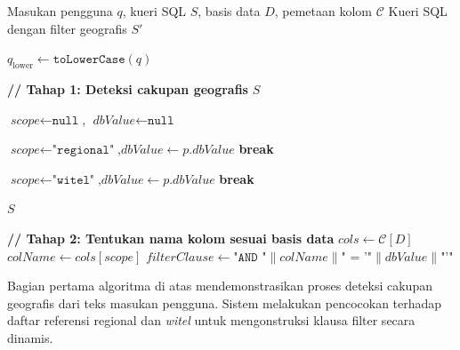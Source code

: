 \begin{algorithm}[htbp]
\caption{Injeksi Filter Geografis ke dalam Kueri SQL (Bagian 1)}
\label{alg:geo-filter-1}
\begin{algorithmic}[1]
\Require Masukan pengguna $q$, kueri SQL $S$, basis data $D$, pemetaan kolom $\mathcal{C}$
\Ensure Kueri SQL dengan filter geografis $S'$

\State $q_{\text{lower}} \gets \texttt{toLowerCase}(q)$

\State \textbf{// Tahap 1: Deteksi cakupan geografis}
    \State \Return $S$ 
\EndIf

\State $\textit{scope} \gets \texttt{null}$, $\textit{dbValue} \gets \texttt{null}$

        \State $\textit{scope} \gets \texttt{"regional"}$,\quad $\textit{dbValue} \gets p.\textit{dbValue}$
        \State \textbf{break}
    \EndIf
\EndFor

            \State $\textit{scope} \gets \texttt{"witel"}$,\quad $\textit{dbValue} \gets p.\textit{dbValue}$
            \State \textbf{break}
        \EndIf
    \EndFor
\EndIf

    \State \Return $S$ 
\EndIf

\State \textbf{// Tahap 2: Tentukan nama kolom sesuai basis data}
\State $\textit{cols} \gets \mathcal{C}[D]$ 
\State $\textit{colName} \gets \textit{cols}[\textit{scope}]$
\State $\textit{filterClause} \gets \texttt{"AND "} \| \textit{colName} \| \texttt{" = '"} \| \textit{dbValue} \| \texttt{"'"}$

\end{algorithmic}
\end{algorithm}

Bagian pertama algoritma di atas mendemonstrasikan proses deteksi cakupan geografis dari teks masukan pengguna. Sistem melakukan pencocokan terhadap daftar referensi regional dan \textit{witel} untuk mengonstruksi klausa filter secara dinamis. 

